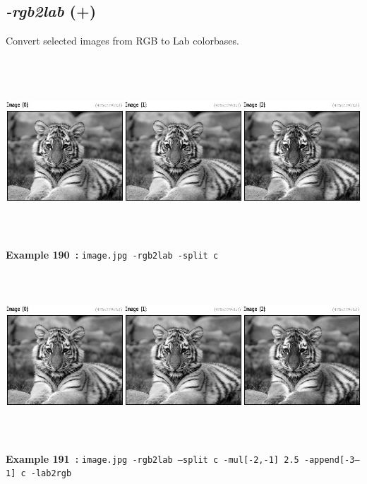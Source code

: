\documentclass[a4paper,11pt,twoside]{book}
\begin{document}
\subsection{\emph{-rgb2lab} (+)}\vspace*{-0.5em}
Convert selected images from RGB to Lab colorbases.
\begin{center}\includegraphics[keepaspectratio=true,height=7cm,width=\textwidth]{img/gmic_def190.jpg}\\
{\footnotesize \textbf{Example 190~:} \texttt{image.jpg -rgb2lab -split c}}
\\\includegraphics[keepaspectratio=true,height=7cm,width=\textwidth]{img/gmic_def191.jpg}\\
{\footnotesize \textbf{Example 191~:} \texttt{image.jpg -rgb2lab --split c -mul[-2,-1] 2.5 -append[-3--1] c -lab2rgb}}
\end{center}
\end{document}
